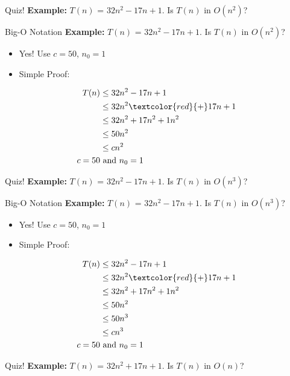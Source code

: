 \documentclass{beamer}
\begin{document}
\begin{frame}{Quiz!}
\textbf{Example:} $T(n)$ = $32n^2-17n+1$.  Is $T(n)$ in $O(n^2)$? 
\end{frame}

\begin{frame}{Big-O Notation}
\textbf{Example:} $T(n)$ = $32n^2-17n+1$.  Is $T(n)$ in $O(n^2)$? 
\begin{itemize}
\item Yes! Use $c=50$, $n_0=1$
\item Simple Proof:
\end{itemize}
\begin{align*}
T(n) &\leq 32n^2-17n+1 \\
&\leq 32n^2\textcolor{red}{+}17n+1 \\
&\leq 32n^2+17n^2+1n^2 \\
&\leq 50n^2\\
&\leq cn^2\\
c=50    &   \text{ and } n_0=1
\end{align*}
\end{frame}


\begin{frame}{Quiz!}
\textbf{Example:} $T(n)$ = $32n^2-17n+1$.  Is $T(n)$ in $O(n^3)$? 
\end{frame}

\begin{frame}{Big-O Notation}
\textbf{Example:} $T(n)$ = $32n^2-17n+1$.  Is $T(n)$ in $O(n^3)$? 
\begin{itemize}
\item Yes! Use $c=50$, $n_0=1$
\item Simple Proof:
\end{itemize}
\begin{align*}
T(n) &\leq 32n^2-17n+1 \\
&\leq 32n^2\textcolor{red}{+}17n+1 \\
&\leq 32n^2+17n^2+1n^2 \\
&\leq 50n^2\\
&\leq 50n^3\\
&\leq cn^3\\
c=50    &   \text{ and } n_0=1
\end{align*}
\end{frame}



\begin{frame}{Quiz!}
\textbf{Example:} $T(n)$ = $32n^2+17n+1$.  Is $T(n)$ in $O(n)$? 
\end{frame}
\end{document}
